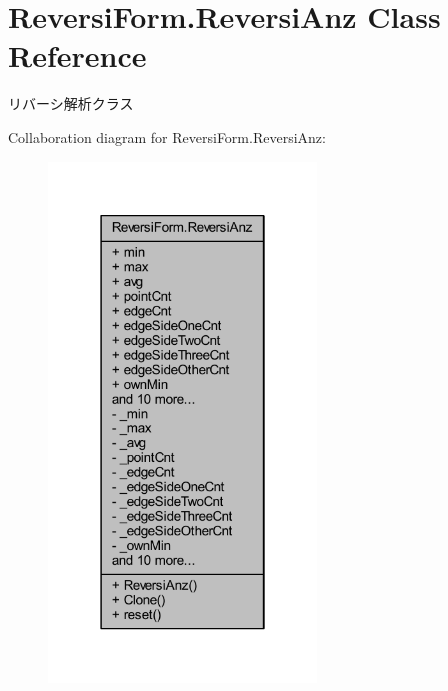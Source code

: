 \hypertarget{class_reversi_form_1_1_reversi_anz}{}\section{Reversi\+Form.\+Reversi\+Anz Class Reference}
\label{class_reversi_form_1_1_reversi_anz}


リバーシ解析クラス  




Collaboration diagram for Reversi\+Form.\+Reversi\+Anz\+:\nopagebreak
\begin{figure}[H]
\begin{center}
\leavevmode
\includegraphics[width=202pt]{class_reversi_form_1_1_reversi_anz__coll__graph}
\end{center}
\end{figure}
